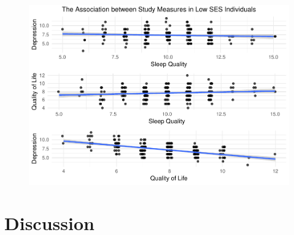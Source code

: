 \documentclass[man]{apa6}
\theoremstyle{definition}
\theoremstyle{definition}
\theoremstyle{definition}
\theoremstyle{remark}
\begin{document}
\begin{figure}
\centering
\includegraphics{APA_Document_files/figure-latex/Figure 5-1.pdf}
\caption{}
\end{figure}

\section{Discussion}\label{discussion}
\end{document}
